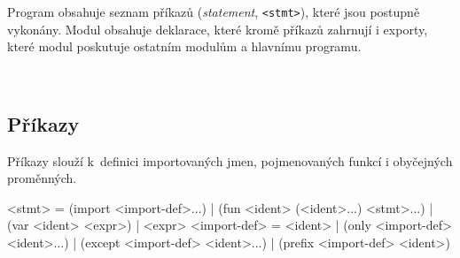 Program obsahuje seznam příkazů (\emph{statement}, \texttt{<stmt>}), které jsou
postupně vykonány. Modul obsahuje deklarace, které kromě příkazů zahrnují i
exporty, které modul poskutuje ostatním modulům a hlavnímu programu.

~
\subsection{Příkazy}

Příkazy slouží k~definici importovaných jmen, pojmenovaných funkcí i obyčejných
proměnných.

\begin{ttcode}
<stmt>        = (import <import-def>...)
              | (fun <ident> (<ident>...) <stmt>...)
              | (var <ident> <expr>)
              | <expr>
<import-def>  = <ident>
              | (only <import-def> <ident>...)
              | (except <import-def> <ident>...)
              | (prefix <import-def> <ident>)
\end{ttcode}


